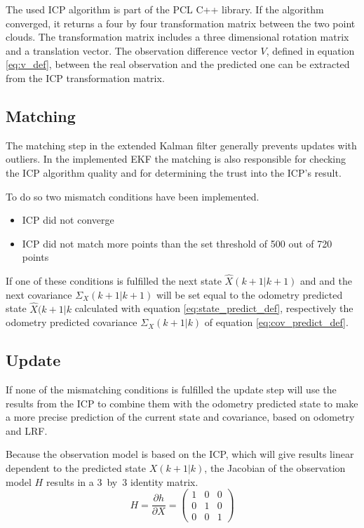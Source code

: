 The used ICP algorithm is part of the PCL C++ library. If the algorithm converged, it returns a four by four transformation matrix between the two point clouds. The transformation matrix includes a three dimensional rotation matrix and a translation vector. The observation difference vector $V$, defined in equation \eqref{eq:v_def}, between the real observation and the predicted one can be extracted from the ICP transformation matrix. 

\subsection{Matching}
\label{subsec:Matching}
The matching step in the extended Kalman filter generally prevents updates with outliers. In the implemented EKF the matching is also responsible for checking the ICP algorithm quality and for determining the trust into the ICP's result. 

To do so two mismatch conditions have been implemented.
\begin{itemize}
\item ICP did not converge
\item ICP did not match more points than the set threshold of 500 out of 720 points
\end{itemize}
If one of these conditions is fulfilled the next state $\hat{X}(k+1|k+1)$ and and the next covariance $\Sigma_X (k+1|k+1)$ will be set equal to the odometry predicted state $\hat{X}(k+1|k$ calculated with equation \eqref{eq:state_predict_def}, respectively the odometry predicted covariance $\Sigma_{X}(k+1|k)$ of equation \eqref{eq:cov_predict_def}.

\subsection{Update}
\label{subsec:Update}
If none of the mismatching conditions is fulfilled the update step will use the results from the ICP to combine them with the odometry predicted state to make a more precise prediction of the current state and covariance, based on odometry and LRF. 

Because the observation model is based on the ICP, which will give results linear dependent to the predicted state \mbox{$X(k+1|k)$}, the Jacobian of the observation model $H$ results in a \mbox{3 by 3} identity matrix.
\begin{equation}
H = \frac{\partial h}{\partial X} =\begin{pmatrix} 1 & 0 & 0 \\ 0 & 1 & 0 \\ 0 & 0 & 1\end{pmatrix} \label{eq:H_def}
\end{equation}

